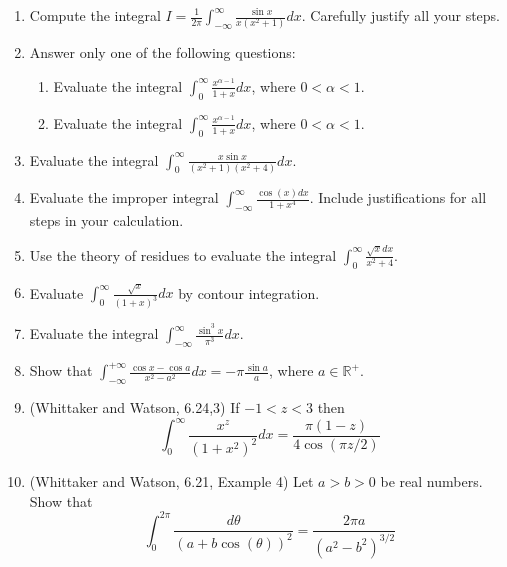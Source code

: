 \documentclass[a4paper,10pt]{article}
\begin{document}
\begin{enumerate}
\item 
	
	Compute the integral $I = \frac{1}{2\pi}\int_{-\infty}^{\infty}\frac{\sin x}{x(x^{2}+1)}dx$. Carefully justify all your steps.
	
\item 
	
	Answer only one of the following questions:
	
	\begin{enumerate}
		\item Evaluate the integral $\int_{0}^{\infty}\frac{x^{\alpha-1}}{1+x}dx$, where $0 < \alpha < 1$.
		\item Evaluate the integral $\int_{0}^{\infty}\frac{x^{\alpha-1}}{1+x}dx$, where $0 < \alpha < 1$.
	\end{enumerate}


	
	\item Evaluate the integral $\int_{0}^{\infty}\frac{x \sin x}{(x^{2}+1)(x^{2}+4)}dx$.
	
	\item Evaluate the improper integral $\int_{-\infty}^{\infty}\frac{\cos(x)dx}{1+x^{4}}$. Include justifications for all steps in your calculation.
	
	\item Use the theory of residues to evaluate the integral $\int_{0}^{\infty}\frac{\sqrt{x}dx}{x^{2}+4}$.

	\item Evaluate $\int_{0}^{\infty}\frac{\sqrt{x}}{(1+x)^{3}}dx$ by contour integration.
	
	\item Evaluate the integral $\int_{-\infty}^{\infty}\frac{\sin^{3}x}{\pi^{3}}dx$.
	

	
	\item Show that $\int_{-\infty}^{+\infty}\frac{\cos x - \cos a}{x^{2}-a^{2}}dx = -\pi\frac{\sin a}{a}$, where $a \in \mathbb{R}^{+}$.
	
		\item (Whittaker and Watson, 6.24,3)
	If $-1 < z < 3$ then 
	$$ \int_0^{\infty} \frac{x^z}{(1+x^2)^2}dx = \frac{\pi (1-z) }{4 \cos( \pi z/2) }$$
	
	\item (Whittaker and Watson, 6.21, Example 4)
	Let $a>b>0$ be real numbers. 
	Show that 
	$$ \int_0^{2\pi} \frac{d\theta}{(a+b\cos(\theta))^2} = \frac{2\pi a}{(a^2-b^2)^{3/2}}$$
	
	

\end{enumerate}
\end{document}
